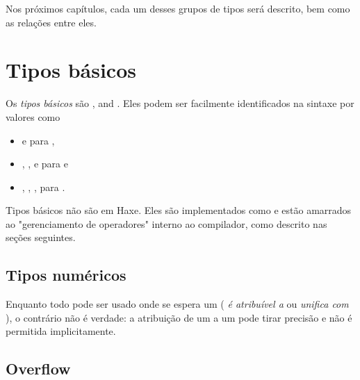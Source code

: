 Nos próximos capítulos, cada um desses grupos de tipos será descrito, bem como as relações entre eles.



\section{Tipos básicos}
\label{types-basic-types}

Os \emph{tipos básicos} são ,  and . Eles podem ser facilmente identificados na sintaxe por valores como

\begin{itemize}
	\item {} e  para ,
	\item {}, ,  e  para  e
	\item {}, , ,  para .
\end{itemize}

Tipos básicos não são  em Haxe. Eles são implementados como  e estão amarrados ao "gerenciamento de operadores" interno ao compilador, como descrito nas seções seguintes.

\subsection{Tipos numéricos}
\label{types-numeric-types}


Enquanto todo  pode ser usado onde se espera um  ( \emph{é atribuível a} ou \emph{unifica com} ), o contrário não é verdade: a atribuição de um  a um  pode tirar precisão e não é permitida implicitamente.

\subsection{Overflow}
\label{types-overflow}

